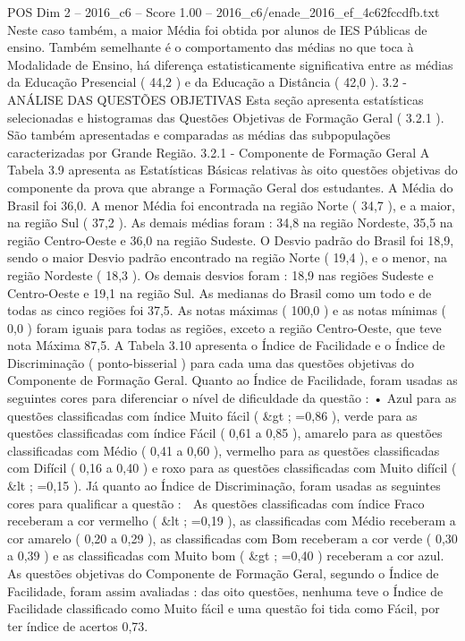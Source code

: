 \begin{textsample}{POS Dim 2 – 2016\_c6 – Score 1.00 – 2016\_c6/enade\_2016\_ef\_4c62fccdfb.txt}
Neste caso também, a maior Média foi obtida por alunos de IES Públicas de ensino.
Também semelhante é o comportamento das médias no que toca à Modalidade de Ensino, há diferença estatisticamente significativa entre as médias da Educação Presencial ( 44,2 ) e da Educação a Distância ( 42,0 ). 3.2 - ANÁLISE DAS QUESTÕES OBJETIVAS Esta seção apresenta estatísticas selecionadas e histogramas das Questões Objetivas de Formação Geral ( 3.2.1 ).
São também apresentadas e comparadas as médias das subpopulações caracterizadas por Grande Região. 3.2.1 - Componente de Formação Geral A Tabela 3.9 apresenta as Estatísticas Básicas relativas às oito questões objetivas do componente da prova que abrange a Formação Geral dos estudantes.
A Média do Brasil foi 36,0.
A menor Média foi encontrada na região Norte ( 34,7 ), e a maior, na região Sul ( 37,2 ).
As demais médias foram : 34,8 na região Nordeste, 35,5 na região Centro-Oeste e 36,0 na região Sudeste.
O Desvio padrão do Brasil foi 18,9, sendo o maior Desvio padrão encontrado na região Norte ( 19,4 ), e o menor, na região Nordeste ( 18,3 ).
Os demais desvios foram : 18,9 nas regiões Sudeste e Centro-Oeste e 19,1 na região Sul.
As medianas do Brasil como um todo e de todas as cinco regiões foi 37,5.
As notas máximas ( 100,0 ) e as notas mínimas ( 0,0 ) foram iguais para todas as regiões, exceto a região Centro-Oeste, que teve nota Máxima 87,5.
A Tabela 3.10 apresenta o Índice de Facilidade e o Índice de Discriminação ( ponto-bisserial ) para cada uma das questões objetivas do Componente de Formação Geral.
Quanto ao Índice de Facilidade, foram usadas as seguintes cores para diferenciar o nível de dificuldade da questão : • Azul para as questões classificadas com índice Muito fácil ( \&gt ; =0,86 ), verde para as questões classificadas com índice Fácil ( 0,61 a 0,85 ), amarelo para as questões classificadas com Médio ( 0,41 a 0,60 ), vermelho para as questões classificadas com Difícil ( 0,16 a 0,40 ) e roxo para as questões classificadas com Muito difícil ( \&lt ; =0,15 ).
Já quanto ao Índice de Discriminação, foram usadas as seguintes cores para qualificar a questão :  As questões classificadas com índice Fraco receberam a cor vermelho ( \&lt ; =0,19 ), as classificadas com Médio receberam a cor amarelo ( 0,20 a 0,29 ), as classificadas com Bom receberam a cor verde ( 0,30 a 0,39 ) e as classificadas com Muito bom ( \&gt ; =0,40 ) receberam a cor azul.
As questões objetivas do Componente de Formação Geral, segundo o Índice de Facilidade, foram assim avaliadas : das oito questões, nenhuma teve o Índice de Facilidade classificado como Muito fácil e uma questão foi tida como Fácil, por ter índice de acertos 0,73.

\end{textsample}
